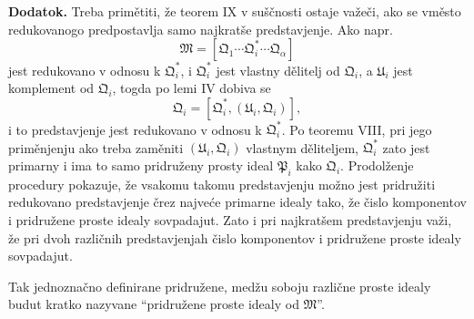 \documentclass[11pt]{article}
\newcommand{\ideal}[1]{\mathfrak{#1}}
\begin{document}
\textbf{Dodatok.} Treba primětiti, že teorem IX v suščnosti ostaje važeči, ako se vměsto redukovanogo predpostavlja samo najkratše predstavjenje. Ako napr.
\[
 \ideal M=[\ideal Q_1\cdots\ideal Q_i^*\cdots\ideal Q_\alpha]
\]
jest redukovano v odnosu k \(\ideal Q_i^*\), i \(\ideal Q_i^*\) jest vlastny dělitelj od \(\ideal Q_i\), a \(\ideal U_i\) jest komplement od \(\ideal Q_i\), togda po lemi IV dobiva se
\[
 \ideal Q_i=[\ideal Q_i^*,(\ideal U_i,\ideal Q_i)],
\]
i to predstavjenje jest redukovano v odnosu k \(\ideal Q_i^*\). Po teoremu VIII, pri jego priměnjenju ako treba zaměniti \((\ideal U_i,\ideal Q_i)\) vlastnym děliteljem, \(\ideal Q_i^*\) zato jest primarny i ima to samo pridruženy prosty ideal \(\ideal P_i\) kako \(\ideal Q_i\). Prodolženje procedury pokazuje, že vsakomu takomu predstavjenju možno jest pridružiti redukovano predstavjenje črez najveće primarne idealy tako, že čislo komponentov i pridružene proste idealy sovpadajut. Zato i pri najkratšem predstavjenju važi, že pri dvoh različnih predstavjenjah čislo komponentov i pridružene proste idealy sovpadajut.

Tak jednoznačno definirane pridružene, medžu soboju različne proste idealy budut kratko nazyvane ``pridružene proste idealy od \(\ideal M\)''.
\end{document}
